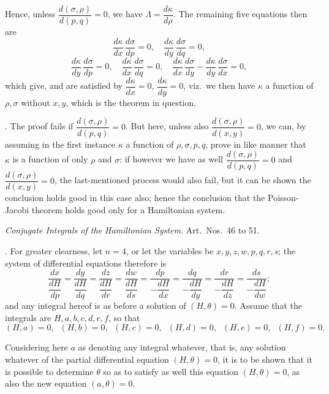 \documentclass[11pt,a4paper]{article}
\begin{document}
\newpage


Hence, unless $\dfrac{d(\sigma, \rho)}{d(p, q)} = 0$, we have $\Lambda = \dfrac{d\kappa}{d\rho}$. The remaining five equations then are
\[
\frac{d\kappa}{dx}\,\frac{d\sigma}{dp} = 0, \quad \frac{d\kappa}{dy}\,\frac{d\sigma}{dq} = 0,
\]
\[
\frac{d\kappa}{dy}\,\frac{d\sigma}{dp} = 0, \quad \frac{d\kappa}{dx}\,\frac{d\sigma}{dq} = 0, \quad \frac{d\kappa}{dx}\,\frac{d\sigma}{dy} - \frac{d\kappa}{dy}\,\frac{d\sigma}{dx} = 0,
\]
which give, and are satisfied by $\dfrac{d\kappa}{dx} = 0$, $\dfrac{d\kappa}{dy} = 0$, viz.\ we then have $\kappa$ a function of $\rho, \sigma$ without $x, y$, which is the theorem in question.

\medskip

. The proof fails if $\dfrac{d(\sigma, \rho)}{d(p, q)} = 0$. But here, unless also $\dfrac{d(\sigma, \rho)}{d(x, y)} = 0$, we can, by assuming in the first instance $\kappa$ a function of $\rho, \sigma, p, q$, prove in like manner that $\kappa$ is a function of only $\rho$ and $\sigma$: if however we have as well $\dfrac{d(\sigma, \rho)}{d(p, q)} = 0$ and $\dfrac{d(\sigma, \rho)}{d(x, y)} = 0$, the last-mentioned process would also fail, but it can be shown the conclusion holds good in this case also; hence the conclusion that the Poisson-Jacobi theorem holds good only for a Hamiltonian system.

\bigskip

\begin{center}
\emph{Conjugate Integrals of the Hamiltonian System.} Art.\ Nos.\ 46 to 51.
\end{center}

\medskip

. For greater clearness, let $n = 4$, or let the variables be $x, y, z, w, p, q, r, s$; the system of differential equations therefore is
\[
\frac{dx}{\dfrac{dH}{dp}} = \frac{dy}{\dfrac{dH}{dq}} = \frac{dz}{\dfrac{dH}{dr}} = \frac{dw}{\dfrac{dH}{ds}} = \frac{dp}{-\dfrac{dH}{dx}} = \frac{dq}{-\dfrac{dH}{dy}} = \frac{dr}{-\dfrac{dH}{dz}} = \frac{ds}{-\dfrac{dH}{dw}};
\]
and any integral hereof is as before a solution of $(H, \theta) = 0$. Assume that the integrals are $H, a, b, c, d, e, f$, so that
\[
(H, a) = 0, \;\; (H, b) = 0, \;\; (H, c) = 0, \;\; (H, d) = 0, \;\; (H, e) = 0, \;\; (H, f) = 0.
\]

Considering here $a$ as denoting any integral whatever, that is, any solution whatever of the partial differential equation $(H, \theta) = 0$, it is to be shown that it is possible to determine $\theta$ so as to satisfy as well this equation $(H, \theta) = 0$, as also the new equation $(a, \theta) = 0$.
\end{document}
